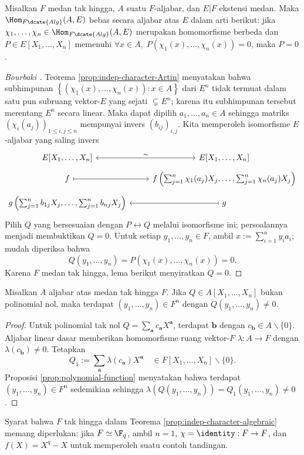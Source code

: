 \begin{theorem}\label{prop:indep-character-algebraic}
	Misalkan $F$ medan tak hingga, $A$ suatu $F$-aljabar, dan $E|F$ ekstensi medan. Maka $\Hom_{F\dcate{Alg}}(A,E)$ bebas secara aljabar atas $E$ dalam arti berikut: jika $\chi_1, \ldots, \chi_n \in \Hom_{F\dcate{Alg}}(A,E)$ merupakan homomorfisme berbeda dan $P \in E[X_1, \ldots, X_n]$ memenuhi $\forall x \in A, \; P(\chi_1(x), \ldots, \chi_n(x))=0$, maka $P=0$.
\end{theorem}
\begin{proof}[Bourbaki {\cite[V. \S 6.2]{Bou-Alg2}}]
	Teorema \ref{prop:indep-character-Artin} menyatakan bahwa subhimpunan $\left\{ (\chi_1(x), \ldots, \chi_n(x)) : x \in A \right\}$ dari $E^n$ tidak termuat dalam satu pun subruang vektor-$E$ yang sejati $\subsetneq E^n$; karena itu subhimpunan tersebut merentang $E^n$ secara linear. Maka dapat dipilih $a_1, \ldots, a_n \in A$ sehingga matriks $(\chi_i(a_j))_{1 \leq i,j \leq n}$ mempunyai invers $(b_{ij})_{i,j}$. Kita memperoleh isomorfisme $E$-aljabar yang saling invers
	\[ \begin{tikzcd}[row sep=tiny]
	E[X_1, \ldots, X_n] \arrow[leftrightarrow, r, "\sim"] & E[X_1, \ldots, X_n] \\
	f \arrow[mapsto, r] & f\left( \sum_{j=1}^n \chi_1(a_j) X_j, \ldots, \sum_{j=1}^n \chi_n(a_j) X_j \right) \\
	g\left( \sum_{j=1}^n b_{1j} X_j, \ldots, \sum_{j=1}^n b_{nj} X_j \right) & g \arrow[mapsto, l]
	\end{tikzcd}\]
	Pilih $Q$ yang bersesuaian dengan $P \leftrightarrow Q$ melalui isomorfisme ini; persoalannya menjadi membuktikan $Q=0$. Untuk setiap $y_1, \ldots, y_n \in F$, ambil $x := \sum_{i=1}^n y_i a_i$; mudah diperiksa bahwa
	\[ Q(y_1, \ldots, y_n) = P(\chi_1(x), \ldots, \chi_n(x)) = 0. \]
	Karena $F$ medan tak hingga, lema berikut menyiratkan $Q=0$.
\end{proof}

\begin{lemma}
	Misalkan $A$ aljabar atas medan tak hingga $F$. Jika $Q\in A[X_1,\ldots,X_n]$ bukan polinomial nol, maka terdapat $(y_1,\ldots,y_n)\in F^n$ dengan $Q(y_1,\ldots,y_n)\neq0$.
\end{lemma}
\begin{proof}
	Untuk polinomial tak nol $Q = \sum_{\bm{a}} c_{\bm{a}} X^{\bm{a}}$, terdapat $\bm{b}$ dengan $c_{\bm{b}} \in A \smallsetminus \{0\}$. Aljabar linear dasar memberikan homomorfisme ruang vektor-$F$ $\lambda: A \to F$ dengan $\lambda(c_{\bm{b}}) \neq 0$. Tetapkan
	\[ Q_1 := \sum_{\bm{a}} \lambda(c_{\bm{a}}) X^{\bm{a}} \quad \in F[X_1, \ldots, X_n] \smallsetminus \{0\}. \]
	Proposisi \ref{prop:polynomial-function} menyatakan bahwa terdapat $(y_1,\ldots,y_n)\in F^n$ sedemikian sehingga $\lambda(Q(y_1,\ldots,y_n))=Q_1(y_1,\ldots,y_n)\neq0$.
\end{proof}
Syarat bahwa $F$ tak hingga dalam Teorema \ref{prop:indep-character-algebraic} memang diperlukan: jika $F\simeq\F_q$, ambil $n=1$, $\chi=\identity:F\to F$, dan $f(X)=X^q-X$ untuk memperoleh suatu contoh tandingan.

